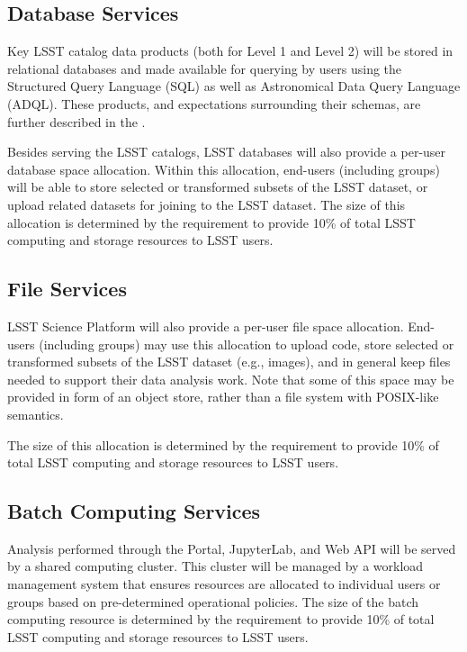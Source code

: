 \documentclass[DM,lsstdraft,toc]{lsstdoc}
\begin{document}
\subsection{Database Services}

Key LSST catalog data products (both for Level 1 and Level 2) will be stored in relational databases and made available for querying by users using the Structured Query Language (SQL) as well as Astronomical Data Query Language (ADQL). These products, and expectations surrounding their schemas, are further described in the \DPDD.

Besides serving the LSST catalogs, LSST databases will also provide a per-user database space allocation. Within this allocation, end-users (including groups) will be able to store selected or transformed subsets of the LSST dataset, or upload related datasets for joining to the LSST dataset. The size of this allocation is determined by the \SRD requirement to provide 10\% of total LSST computing and storage resources to LSST users.

\subsection{File Services}

LSST Science Platform will also provide a per-user file space allocation. End-users (including groups) may use this allocation to upload code, store selected or transformed subsets of the LSST dataset (e.g., images), and in general keep files needed to support their data analysis work. Note that some of this space may be provided in form of an object store, rather than a file system with POSIX-like semantics.

The size of this allocation is determined by the \SRD requirement to provide 10\% of total LSST computing and storage resources to LSST users.

\subsection{Batch Computing Services}

Analysis performed through the Portal, JupyterLab, and Web API will be served by a shared computing cluster. This cluster will be managed by a workload management system that ensures resources are allocated to individual users or groups based on pre-determined operational policies. The size of the batch computing resource is determined by the \SRD requirement to provide 10\% of total LSST computing and storage resources to LSST users.
\end{document}
